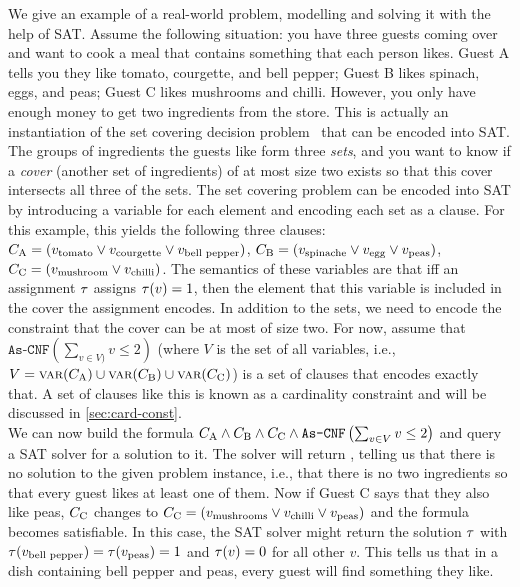 \begin{example}\label{ex:sat-modelling}
  We give an example of a real-world problem, modelling and solving it with the help of SAT.
  Assume the following situation:
  you have three guests coming over and want to cook a meal that contains something that each person likes.
  Guest A tells you they like tomato, courgette, and bell pepper;
  Guest B likes spinach, eggs, and peas;
  Guest C likes mushrooms and chilli.
  However, you only have enough money to get two ingredients from the store.
  This is actually an instantiation of the set covering decision problem~\autocite{DBLP:conf/coco/Karp72} that can be encoded into SAT.
  The groups of ingredients the guests like form three \emph{sets}, and you want to know if a \emph{cover} (another set of ingredients) of at most size two exists so that this cover intersects all three of the sets.
  The set covering problem can be encoded into SAT by introducing a variable for each element and encoding each set as a clause.
  For this example, this yields the following three clauses: $C_\text{A} = (v_\text{tomato} \lor v_\text{courgette} \lor v_\text{bell pepper})$, $C_\text{B} = (v_\text{spinache} \lor v_\text{egg} \lor v_\text{peas})$, $C_\text{C} = (v_\text{mushroom} \lor v_\text{chilli})$.
  The semantics of these variables are that iff an assignment $\tau$ assigns $\tau(v)=1$, then the element that this variable is included in the cover the assignment encodes.
  In addition to the sets, we need to encode the constraint that the cover can be at most of size two.
  For now, assume that $\texttt{As-CNF}\left(\sum_{v \in V)} v \le 2\right)$ (where $V$ is the set of all variables, i.e., $V = \textsc{var}(C_\text{A}) \cup \textsc{var}(C_\text{B}) \cup \textsc{var}(C_\text{C})$) is a set of clauses that encodes exactly that.
  A set of clauses like this is known as a cardinality constraint and will be discussed in \cref{sec:card-const}.\\
  We can now build the formula $C_\text{A} \allowbreak \land C_\text{B} \allowbreak \land C_\text{C} \allowbreak \land \texttt{As-CNF}\left(\sum_{v \in V} v \le 2\right)$ and query a SAT solver for a solution to it.
  The solver will return \unsat{}, telling us that there is no solution to the given problem instance, i.e., that there is no two ingredients so that every guest likes at least one of them.
  Now if Guest C says that they also like peas, $C_\text{C}$ changes to $C_\text{C} = (v_\text{mushrooms} \lor v_\text{chilli} \lor v_\text{peas})$ and the formula becomes satisfiable.
  In this case, the SAT solver might return the solution $\tau$ with $\tau(v_\text{bell pepper}) = \tau(v_\text{peas}) = 1$ and $\tau(v) = 0$ for all other $v$.
  This tells us that in a dish containing bell pepper and peas, every guest will find something they like.
\end{example}

